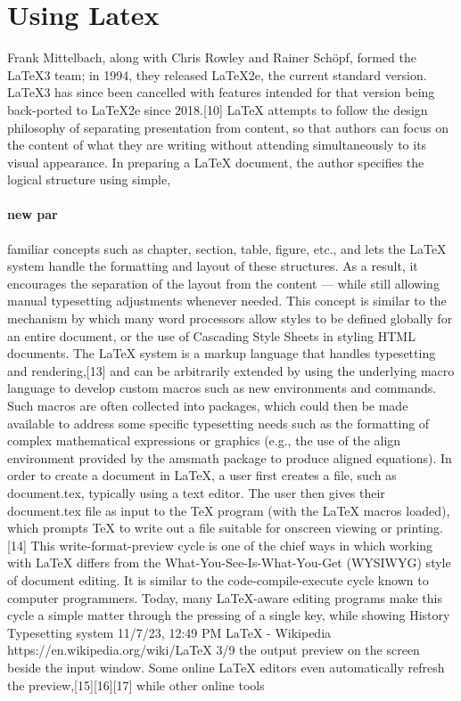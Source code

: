 \documentclass[]{report}
\begin{document}
	\section{Using Latex}Frank Mittelbach, along with Chris Rowley and Rainer Schöpf, formed the LaTeX3 team;
	in 1994, they released LaTeX2e, the current standard version. LaTeX3 has since been cancelled with
	features intended for that version being back-ported to LaTeX2e since 2018.[10]
	LaTeX attempts to follow the design philosophy of separating presentation from content, so that
	authors can focus on the content of what they are writing without attending simultaneously to its
	visual appearance. In preparing a LaTeX document, the author specifies the logical structure using
	simple, 
	
	\paragraph{new par}familiar concepts such as chapter, section, table, figure, etc., and lets the LaTeX system
	handle the formatting and layout of these structures. As a result, it encourages the separation of the
	layout from the content — while still allowing manual typesetting adjustments whenever needed. This
	concept is similar to the mechanism by which many word processors allow styles to be defined
	globally for an entire document, or the use of Cascading Style Sheets in styling HTML documents.
	The LaTeX system is a markup language that handles typesetting and rendering,[13] and can be
	arbitrarily extended by using the underlying macro language to develop custom macros such as new
	environments and commands. Such macros are often collected into packages, which could then be
	made available to address some specific typesetting needs such as the formatting of complex
	mathematical expressions or graphics (e.g., the use of the align environment provided by the
	amsmath package to produce aligned equations).
	In order to create a document in LaTeX, a user first creates a file, such as document.tex, typically
	using a text editor. The user then gives their document.tex file as input to the TeX program (with the
	LaTeX macros loaded), which prompts TeX to write out a file suitable for onscreen viewing or
	printing.[14] This write-format-preview cycle is one of the chief ways in which working with LaTeX
	differs from the What-You-See-Is-What-You-Get (WYSIWYG) style of document editing. It is similar
	to the code-compile-execute cycle known to computer programmers. Today, many LaTeX-aware
	editing programs make this cycle a simple matter through the pressing of a single key, while showing
	History
	Typesetting system
	11/7/23, 12:49 PM LaTeX - Wikipedia
	https://en.wikipedia.org/wiki/LaTeX 3/9
	the output preview on the screen beside the input window. Some online LaTeX editors even
	automatically refresh the preview,[15][16][17] while other online tools
\end{document}
